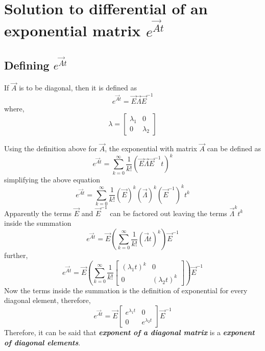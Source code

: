 \section{Solution to differential of an exponential matrix $e^{\vec{A} t}$} \label{Sec_Prelims_solution_matrix_exp}

\subsection{Defining $e^{\vec{A} t}$}
If $\vec{A}$ is to be diagonal, then it is defined as 
\begin{equation}
	e^{\vec{A}t} = \vec{E}\vec{\Lambda}\vec{E}^{-1}
\end{equation}
where,
\begin{equation}
	\lambda = \begin{bmatrix}
	\lambda_{1} & 0 \\ 0 & \lambda_{2}
	\end{bmatrix}
\end{equation}

Using the definition above for $\vec{A}$, the exponential with matrix $\vec{A}$ can be defined as
\begin{equation}
	e^{\vec{A}t} = \sum_{k = 0}^{\infty} \frac{1}{k!}(\vec{E}\vec{\Lambda}\vec{E}^{-1} t)^{k}
\end{equation}
simplifying the above equation
\begin{equation}
	e^{\vec{A}t} = \sum_{k = 0}^{\infty} \frac{1}{k!} (\vec{E})^{k} (\vec{\Lambda})^{k} (\vec{E}^{-1})^{k} t^{k}
\end{equation}
Apparently the terms $\vec{E}$ and $\vec{E}^{-1}$ can be factored out leaving the terms $\vec{\Lambda}^{k} t^{k}$ inside the summation
\begin{equation}
	e^{\vec{A}t} = \vec{E} \left(\sum_{k = 0}^{\infty} \frac{1}{k!} (\vec{\Lambda} t)^{k} \right) \vec{E}^{-1}
\end{equation}
further,
\begin{equation}
e^{\vec{A}t} = \vec{E} \left(\sum_{k = 0}^{\infty} \frac{1}{k!} \begin{bmatrix}
	(\lambda_{1} t)^{k} & 0 \\ 0 & (\lambda_2 t)^{k}
\end{bmatrix} \right) \vec{E}^{-1}
\end{equation}
Now the terms inside the summation is the definition of exponential for every diagonal element, therefore,
\begin{equation}
	e^{\vec{A}t} = \vec{E} \begin{bmatrix}
	e^{\lambda_{1}t} & 0 \\ 0 & e^{\lambda_{2} t}
	\end{bmatrix} \vec{E}^{-1}
\end{equation}
Therefore, it can be said that \textbf{\textit{exponent of a diagonal matrix}} is a \textbf{\textit{exponent of diagonal elements}}.

